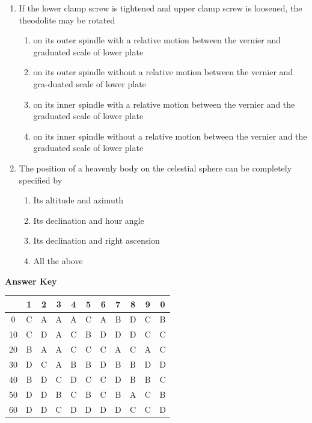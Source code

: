 \documentclass[11pt,a4paper]{article}
\begin{document}
\begin{enumerate}
\\
\item{If the lower clamp screw is tightened and upper clamp screw is loosened, the theodolite may be rotated}
\begin{enumerate}[label=\Alph*.]
\item{on its outer spindle with a relative motion between the vernier and graduated scale of lower plate}
\item{on its outer spindle without a relative motion between the vernier and gra-duated scale of lower plate}
\item{on its inner spindle with a relative motion between the vernier and the graduated scale of lower plate}
\item{on its inner spindle without a relative motion between the vernier and the graduated scale of lower plate}
\end{enumerate}
\item{The position of a heavenly body on the celestial sphere can be completely specified by}
\begin{enumerate}[label=\Alph*.]
\item{Its altitude and azimuth}
\item{Its declination and hour angle}
\item{Its declination and right ascension}
\item{All the above}
\end{enumerate}
\end{enumerate}
\textbf{Answer Key}
\begin{tabular}{ | c | c c c c c c c c c c | }
\hline
 & 1 & 2 & 3 & 4 & 5 & 6 & 7 & 8 & 9 & 0 \\
\hline
0 & C & A & A & A & C & A & B & D & C & B \\
10 & C & D & A & C & B & D & D & D & C & C \\
20 & B & A & A & C & C & C & A & C & A & C \\
30 & D & C & A & B & B & D & B & B & D & D \\
40 & B & D & C & D & C & C & D & B & B & C \\
50 & D & D & B & C & B & C & B & A & C & B \\
60 & D & D & C & D & D & D & D & C & C & D \\
\hline
\end{tabular}
\clearpage
\end{document}
